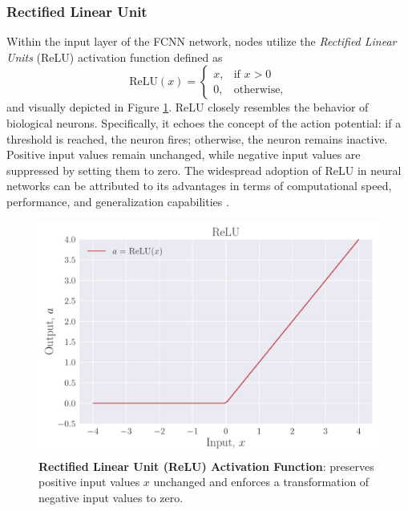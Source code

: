 \documentclass[a4paper, UKenglish, 11pt]{uiomaster}
\begin{document}
\subsubsection{Rectified Linear Unit}
Within the input layer of the FCNN network, nodes utilize the \emph{Rectified Linear Units} (ReLU) activation function
defined as
\begin{equation}
  \text{ReLU}(x) = \begin{cases}
  x, & \text{if } x > 0 \\
  0, & \text{otherwise,}
\end{cases}
\label{eq:ReLU}
\end{equation}
and visually depicted in Figure \ref{fig:ReLU}.
ReLU closely resembles the behavior  of biological neurons. Specifically, it echoes the concept of the action potential: if a threshold is reached, the neuron fires; otherwise, the neuron remains inactive. Positive input values remain unchanged, while negative input values are suppressed by setting them to zero.
The widespread adoption of ReLU in neural networks can be attributed to its advantages in terms of computational speed, performance, and generalization capabilities \cite{wandb_activation_functions}.
\begin{figure}[ht]
    \centering
    \includegraphics[width=\linewidth]{figures/ReLU.pdf}
    \caption{\textbf{Rectified Linear Unit (ReLU) Activation Function}: preserves positive input values \(x\) unchanged and enforces a transformation of negative input values to zero.}
    \label{fig:ReLU}
\end{figure}
\end{document}
